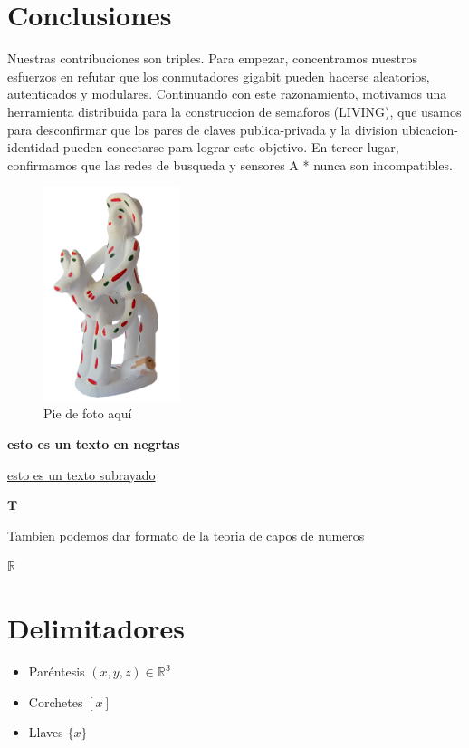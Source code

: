 \documentclass{article}
\begin{document}
\section{Conclusiones}
\label{sec:conclusiones}

Nuestras contribuciones son triples. Para empezar, concentramos nuestros esfuerzos en refutar que los conmutadores gigabit pueden hacerse aleatorios, autenticados y modulares. Continuando con este razonamiento, motivamos una herramienta distribuida para la construccion de semaforos (LIVING), que usamos para desconfirmar que los pares de claves publica-privada y la division ubicacion-identidad pueden conectarse para lograr este objetivo. En tercer lugar, confirmamos que las redes de busqueda y sensores A * nunca son incompatibles.

\begin{figure}[h]
		\centering
		\includegraphics[width=4cm]{siurellp.png}
		\caption{Pie de foto aquí}
		\label{fig:muñequito}
\end{figure}

\textbf{esto es un texto en negrtas}

\underline{esto es un texto subrayado}


$\mathbf{T}$

Tambien podemos dar formato de la teoria de capos de numeros


$\mathbb{R}$

\section{Delimitadores}

\begin{itemize}
	\item Paréntesis $(x,y,z) \in \mathbb{R^3}$
	\item Corchetes  $[x]$
	\item Llaves $\{x\}$
\end{itemize}
\end{document}

